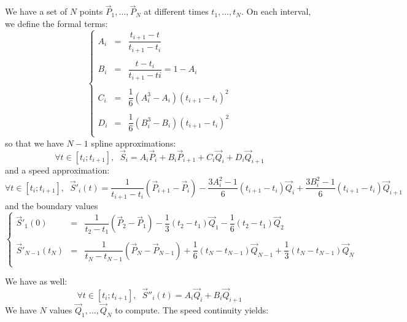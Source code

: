 \documentclass[aps,11pt]{revtex4}
\begin{document}
We have a set of $N$ points $\vec{P}_1,\ldots,\vec{P}_N$ at different times $t_1,\ldots,t_N$.
On each interval, we define the formal terms:
\begin{equation}
\left\lbrace
\begin{array}{rcl}
	A_i & = &\dfrac{t_{i+1}-t}{t_{i+1}-t_{i}}\\
	\\
	B_i & = &\dfrac{t-t_{i}}{t_{i+1}-t{i}} = 1-A_i\\
	\\
	C_i & = & \dfrac{1}{6}\left(A_i^3-A_i\right)\left(t_{i+1}-t_{i}\right)^2\\
	\\
	D_i & = & \dfrac{1}{6}\left(B_i^3-B_i\right)\left(t_{i+1}-t_{i}\right)^2\\
\end{array}
\right.
\end{equation}
so that we have  $N-1$ spline approximations:
\begin{equation}
	\forall t \in [t_{i};t_{i+1}], \;\; \vec{S}_i = A_i \vec{P}_{i} + B_i \vec{P}_{i+1} + C_i \vec{Q}_i + D_i \vec{Q}_{i+1}
\end{equation}
and a speed approximation:
\begin{equation}	
		\forall t \in [t_{i};t_{i+1}],
		 \;\; \vec{S}'_i(t) = 
		 \dfrac{1}{t_{i+1}-t_{i}} \left(\vec{P}_{i+1}-\vec{P}_i\right)
		  - \dfrac{3A_i^2-1}{6}(t_{i+1}-t_{i}) \vec{Q}_i
		  + \dfrac{3B_i^2-1}{6}(t_{i+1}-t_{i}) \vec{Q}_{i+1}
\end{equation}
and the boundary values
\begin{equation}
\left\lbrace
\begin{array}{rcl}
	\vec{S}'_1(0) & = & \dfrac{1}{t_{2}-t_{1}} \left(\vec{P}_{2}-\vec{P}_1\right)
		  - \dfrac{1}{3}(t_{2}-t_{1}) \vec{Q}_1
		  - \dfrac{1}{6}(t_{2}-t_{1}) \vec{Q}_{2}\\
		  \\
		 \vec{S}'_{N-1}(t_N) & = &  \dfrac{1}{t_{N}-t_{N-1}} \left(\vec{P}_{N}-\vec{P}_{N-1}\right)  + \dfrac{1}{6}(t_{N}-t_{N-1}) \vec{Q}_{N-1}
		  + \dfrac{1}{3}(t_{N}-t_{N-1}) \vec{Q}_{N} \\
\end{array}
\right.
\end{equation}

We have as well:
\begin{equation}	
		\forall t \in [t_{i};t_{i+1}],
		 \;\; \vec{S}''_i(t) = A_i \vec{Q}_i + B_i \vec{Q}_{i+1}
\end{equation}
We have $N$ values $\vec{Q}_1,\ldots,\vec{Q}_N$ to compute.
The speed continuity yields:
\end{document}
